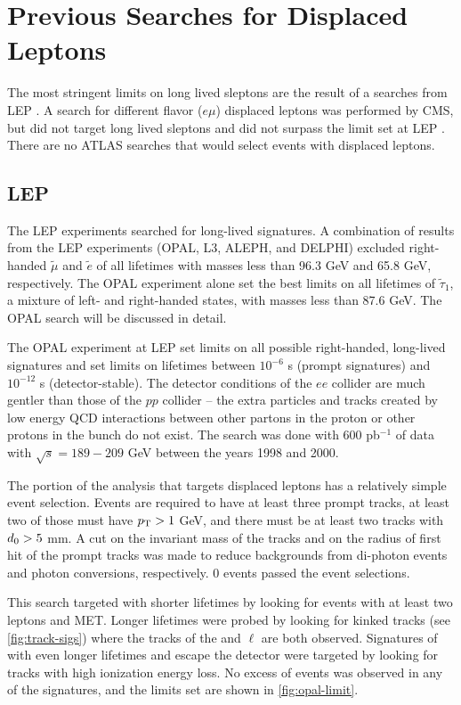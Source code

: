 \section{Previous Searches for Displaced Leptons}

The most stringent limits on long lived sleptons are the result of a searches from \ac{LEP} \cite{opal,L3,delphi,aleph,LEP-comb}. A search for different flavor ($e\mu$) displaced leptons was performed by \ac{CMS}, but did not target long lived sleptons and did not surpass the limit set at LEP \cite{cms-dl}. There are no \ac{ATLAS} searches that would select events with displaced leptons.

\subsection{LEP}
\label{sec:opal-limit}

The \ac{LEP} experiments searched for long-lived \slep signatures. A combination of results from the LEP experiments (OPAL, L3, ALEPH, and DELPHI) excluded right-handed $\tilde{\mu}$ and $\tilde{e}$ of all lifetimes with masses less than 96.3 GeV and 65.8 GeV, respectively. The OPAL experiment alone set the best limits on all lifetimes of $\tilde{\tau}_1$, a mixture of left- and right-handed states, with masses less than 87.6 GeV. The OPAL search will be discussed in detail.

The OPAL experiment at \ac{LEP} set limits on all possible right-handed, long-lived \slep signatures and set limits on \slep lifetimes between $10^{-6}$ s (prompt signatures) and $10^{-12}$ s (detector-stable). The detector conditions of the $ee$ collider are much gentler than those of the $pp$ collider -- the extra particles and tracks created by low energy \ac{QCD} interactions between other partons in the proton or other protons in the bunch do not exist. The search was done with 600 pb$^{-1}$ of data with $\sqrt{s} = 189 - 209$ GeV between the years 1998 and 2000.

The portion of the analysis that targets displaced leptons has a relatively simple event selection. Events are required to have at least three prompt tracks, at least two of those must have $p_{\text{T}} > 1$ GeV, and there must be at least two tracks with $d_0 > 5$ mm. A cut on the invariant mass of the tracks and on the radius of first hit of the prompt tracks was made to reduce backgrounds from di-photon events and photon conversions, respectively. 0 events passed the event selections.

This search targeted \slep with shorter lifetimes by looking for events with at least two leptons and \ac{MET}. Longer lifetimes were probed by looking for kinked tracks (see \autoref{fig:track-sigs}) where the tracks of the \slep and $\ell$ are both observed. Signatures of \slep with even longer lifetimes and escape the detector were targeted by looking for tracks with high ionization energy loss. No excess of events was observed in any of the signatures, and the limits set are shown in \autoref{fig:opal-limit}.


